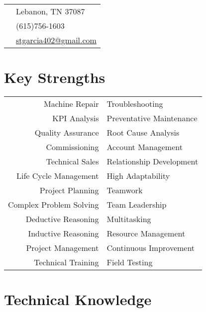 \documentclass[10pt]{article} %
\begin{document}
\begin{minipage}[t]{0.44\textwidth} %
\vspace{0pt} %


\colorbox{shade}{\textcolor{text1}{
\begin{tabular}{c|p{7cm}}
\raisebox{-2pt}{\textifsymbol{18}} & Lebanon, TN 37087 \\ %
\raisebox{-1pt}{\Mobilefone} & (615)756-1603 \\ %
\raisebox{-1pt}{\Letter} & \href{mailto:stgarcia402@gmail.com}{stgarcia402@gmail.com} \\ %
\end{tabular}
}
}\smallskip


\section{Key Strengths} 

\begin{tabular}{rl}
Machine Repair & Troubleshooting \\
KPI Analysis & Preventative Maintenance \\
Quality Assurance & Root Cause Analysis \\
Commissioning & Account Management \\
Technical Sales & Relationship Development \\
Life Cycle Management & High Adaptability \\
Project Planning & Teamwork \\
Complex Problem Solving & Team Leadership \\
Deductive Reasoning & Multitasking \\
Inductive Reasoning & Resource Management \\
Project Management & Continuous Improvement \\ 
Technical Training & Field Testing \\
\end{tabular}
\smallskip

\section{Technical Knowledge} 



\end{minipage}
\end{document}
